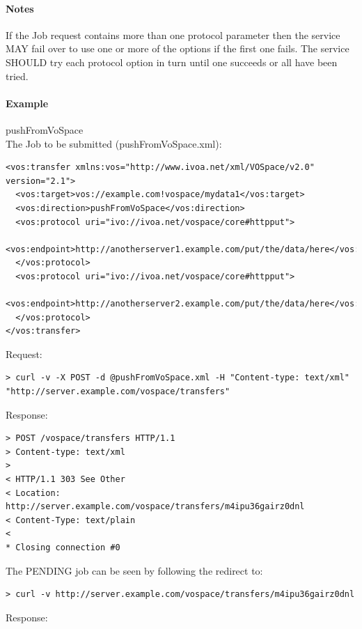 \documentclass[11pt,a4paper]{ivoa}
\begin{document}
\paragraph{Notes}
If the Job request contains more than one protocol parameter then the service MAY fail over to use one or more of the options if the first one fails. The service SHOULD try each protocol option in turn until one succeeds or all have been tried.

\paragraph{Example}
pushFromVoSpace
\\[5px]
\noindent
The Job to be submitted (pushFromVoSpace.xml):
\begin{lstlisting}
<vos:transfer xmlns:vos="http://www.ivoa.net/xml/VOSpace/v2.0" version="2.1">
  <vos:target>vos://example.com!vospace/mydata1</vos:target>
  <vos:direction>pushFromVoSpace</vos:direction>
  <vos:protocol uri="ivo://ivoa.net/vospace/core#httpput">
    <vos:endpoint>http://anotherserver1.example.com/put/the/data/here</vos:endpoint>
  </vos:protocol>
  <vos:protocol uri="ivo://ivoa.net/vospace/core#httpput">
    <vos:endpoint>http://anotherserver2.example.com/put/the/data/here</vos:endpoint>
  </vos:protocol>
</vos:transfer>
\end{lstlisting}
Request:
\begin{lstlisting}
> curl -v -X POST -d @pushFromVoSpace.xml -H "Content-type: text/xml" "http://server.example.com/vospace/transfers"
\end{lstlisting}
Response:
\begin{lstlisting}
> POST /vospace/transfers HTTP/1.1
> Content-type: text/xml
>
< HTTP/1.1 303 See Other
< Location: http://server.example.com/vospace/transfers/m4ipu36gairz0dnl
< Content-Type: text/plain
<
* Closing connection #0
\end{lstlisting}
The PENDING job can be seen by following the redirect to:
\begin{lstlisting}
> curl -v http://server.example.com/vospace/transfers/m4ipu36gairz0dnl
\end{lstlisting}
Response:
\end{document}
